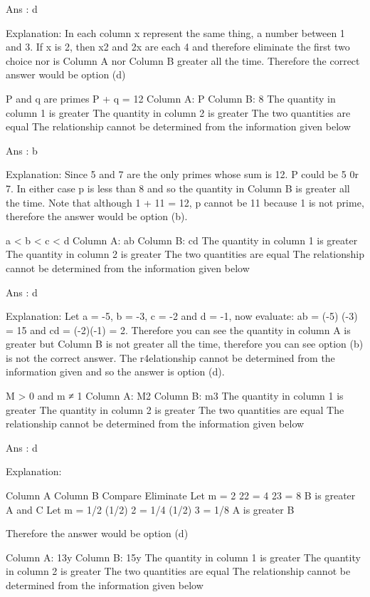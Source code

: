     Ans : d

    Explanation:
    In each column x represent the same thing, a number between 1 and 3. If x is 2, then x2 and 2x are each 4 and therefore eliminate the first two choice nor is Column A nor Column B greater all the time. Therefore the correct answer would be option (d)

    P and q are primes
    P + q = 12
    Column A: P
    Column B: 8
        The quantity in column 1 is greater
        The quantity in column 2 is greater
        The two quantities are equal
        The relationship cannot be determined from the information given below 

    Ans : b

    Explanation:
    Since 5 and 7 are the only primes whose sum is 12. P could be 5 0r 7. In either case p is less than 8 and so the quantity in Column B is greater all the time. Note that although 1 + 11 = 12, p cannot be 11 because 1 is not prime, therefore the answer would be option (b).

    a < b < c < d
    Column A: ab
    Column B: cd
        The quantity in column 1 is greater
        The quantity in column 2 is greater
        The two quantities are equal
        The relationship cannot be determined from the information given below 

    Ans : d

    Explanation:
    Let a = -5, b = -3, c = -2 and d = -1, now evaluate: ab = (-5) (-3) = 15 and cd = (-2)(-1) = 2.
    Therefore you can see the quantity in column A is greater but Column B is not greater all the time, therefore you can see option (b) is not the correct answer. The r4elationship cannot be determined from the information given and so the answer is option (d).

    M > 0 and m ≠ 1
    Column A: M2
    Column B: m3
        The quantity in column 1 is greater
        The quantity in column 2 is greater
        The two quantities are equal
        The relationship cannot be determined from the information given below 

    Ans : d

    Explanation:

        Column A    Column B    Compare     Eliminate
    Let m = 2   22 = 4  23 = 8  B is greater    A and C
    Let m = 1/2     (1/2) 2 = 1/4   (1/2) 3 = 1/8   A is greater    B

    Therefore the answer would be option (d)

    Column A: 13y
    Column B: 15y
        The quantity in column 1 is greater
        The quantity in column 2 is greater
        The two quantities are equal
        The relationship cannot be determined from the information given below 

